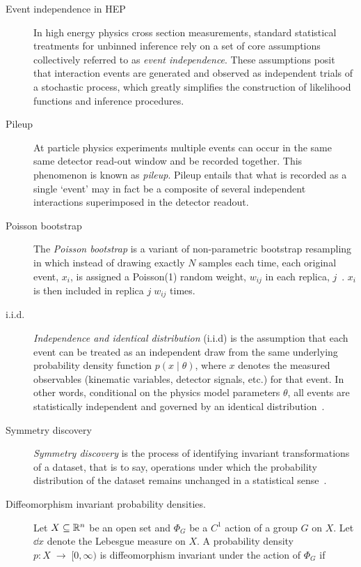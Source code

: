 \begin{description}
\item [Event independence in HEP]
    In high energy physics cross section measurements, standard statistical treatments for unbinned inference rely on a set of core assumptions collectively referred to as \emph{event independence}. 
    These assumptions posit that interaction events are generated and observed as independent trials of a stochastic process, which greatly simplifies the construction of likelihood functions and inference procedures.

\item [Pileup]
        At particle physics experiments multiple events can occur in the same same detector read-out window and be recorded together.
        This phenomenon is known as \emph{pileup}.
        Pileup entails that what is recorded as a single `event' may in fact be a composite of several independent interactions superimposed in the detector readout.

\item [Poisson bootstrap]
                The \emph{Poisson bootstrap} is a variant of non-parametric bootstrap resampling in which instead of drawing exactly $N$ samples each time, each original event, \(x_i\), is assigned a Poisson(1) random weight, \(w_{ij}\) in each replica, \(j\)~\cite{Lyons:2011cli, Bohm:2013gla}.
                \(x_i\) is then included in replica \(j\;w_{ij}\) times.

\item [i.i.d.]
            \emph{Independence and identical distribution} (i.i.d) is the assumption that each event can be treated as an independent draw from the same underlying probability density function $p(x\mid\theta)$, where $x$ denotes the measured observables (kinematic variables, detector signals, etc.) for that event.
            In other words, conditional on the physics model parameters $\theta$, all events are statistically independent and governed by an identical distribution~\cite{Nachman2021EOnce, ParticleDataGroup:2022pth, cowan_statistical_1998, Stakia:2021pvp}.

\item 
            [Symmetry discovery]         \emph{Symmetry discovery} is the process of identifying invariant transformations of a dataset, that is to say, operations under which the probability distribution of the dataset remains unchanged in a statistical sense~\cite{shaw_lie_2025, shaw_symmetry_2024, hagemeyer_learning_2022}.

\item [Diffeomorphism invariant probability densities.]
        Let $X\subseteq\mathbb{R}^n$ be an open set and \(\Phi_G\) be a $C^1$ action of a group $G$ on $X$. 
        Let $\dd x$ denote the Lebesgue measure on $X$.
        A probability density \(p : X \;\to\; [0,\infty)\) is diffeomorphism invariant under the action of \(\Phi_G\) if


\end{description}
